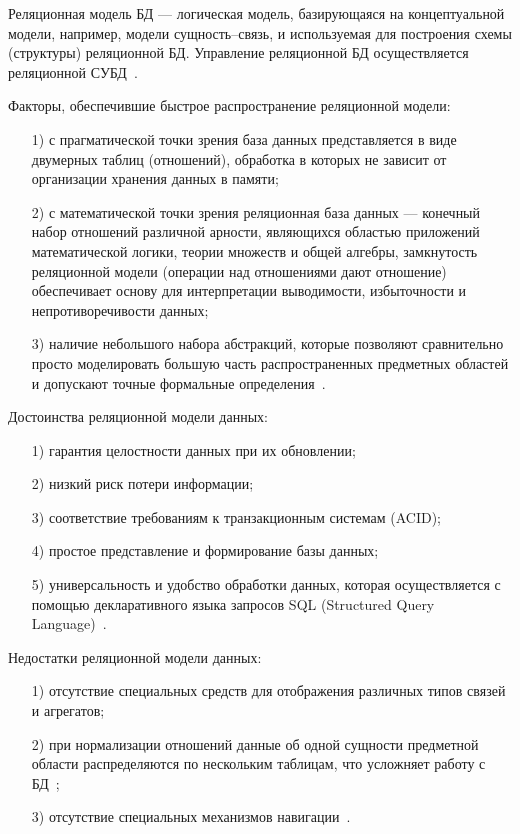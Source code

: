 \documentclass{bmstu}
\begin{document}
Реляционная модель БД --- логическая модель, базирующаяся на концептуальной модели, например, модели сущность–связь, и используемая для построения схемы (структуры) реляционной БД. 
Управление реляционной БД осуществляется реляционной СУБД~\cite{Vinogradov2016}.

Факторы, обеспечившие быстрое распространение реляционной
модели:

\begin{enumerate}
\item[1)] с прагматической точки зрения база данных представляется в виде двумерных таблиц (отношений), обработка в которых не зависит от организации хранения данных в памяти;
\item[2)] с математической точки зрения реляционная база данных --- конечный набор отношений различной арности, являющихся областью приложений математической логики, теории множеств и общей алгебры, замкнутость реляционной модели (операции над отношениями дают отношение) обеспечивает основу для интерпретации выводимости, избыточности и непротиворечивости данных;
\item[3)] наличие небольшого набора абстракций, которые позволяют сравнительно просто моделировать большую часть распространенных предметных областей и допускают точные формальные определения~\cite{Avrunev2018}.
\end{enumerate}

Достоинства реляционной модели данных:

\begin{enumerate}
\item[1)] гарантия целостности данных при их обновлении;
\item[2)] низкий риск потери информации;
\item[3)] соответствие требованиям к транзакционным системам (ACID);
\item[4)] простое представление и формирование базы данных;
\item[5)] универсальность и удобство обработки данных, которая осуществляется с помощью декларативного языка запросов SQL (Structured Query Language)~\cite{Karpova2009}.
\end{enumerate}

Недостатки реляционной модели данных:

\begin{enumerate}
\item[1)] отсутствие специальных средств для отображения различных типов связей и агрегатов;
\item[2)] при нормализации отношений данные об одной сущности предметной области распределяются по нескольким таблицам, что усложняет работу с БД~\cite{Karpova2009};
\item[3)] отсутствие специальных механизмов навигации~\cite{Karpova2005}.
\end{enumerate}
\end{document}
